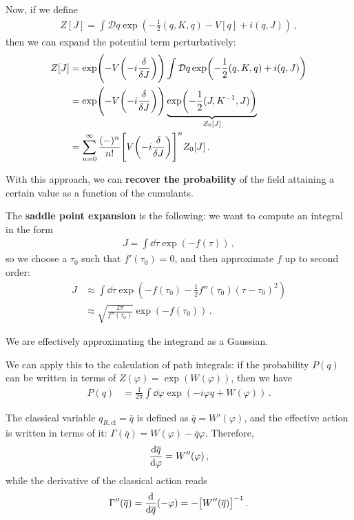 \documentclass[main.tex]{subfiles}
\begin{document}
Now, if we define 
%
\begin{align}
Z[J] = \int \mathcal{D}q \exp(- \frac{1}{2} (q, K, q) - V[q] + i (q, J) )
\,,
\end{align}
%
then we can expand the potential term perturbatively: 
%
\begin{align}
Z[J] &= \exp(- V \qty(-i \fdv{}{J})) 
\int \mathcal{D}q \exp(- \frac{1}{2} (q, K, q) + i (q, J) )  \\
&= \exp(- V \qty(-i \fdv{}{J}))
\underbrace{\exp(- \frac{1}{2} (J, K^{-1}, J))}_{Z_0 [J]}  \\
&= \sum _{n=0}^{\infty } \frac{(-)^{n}}{n!} \qty[V \qty(-i \fdv{}{J})]^{n} Z_0 [J]
\,.
\end{align}

With this approach, we can \textbf{recover the probability} of the field attaining a certain value as a function of the cumulants.

The \textbf{saddle point expansion} is the following: we want to compute an integral in the form 
%
\begin{align}
J = \int \dd{\tau } \exp(
    - f(\tau )
)
\,,
\end{align}
%
so we choose a \(\tau_0 \) such that \(f' (\tau_0 ) = 0\), and then approximate \(f\) up to second order: 
%
\begin{align}
J &\approx \int \dd{\tau } \exp(
    - f(\tau_0 ) - \frac{1}{2} f''(\tau_0 ) (\tau - \tau_0  )^2
)  \\
&\approx \sqrt{\frac{2 \pi }{f''(\tau_0 )}} \exp(- f(\tau_0 ))
\,.
\end{align}

We are effectively approximating the integrand as a Gaussian. 

We can apply this to the calculation of path integrals: if the probability \(P(q)\) can be written in terms of \(Z(\varphi ) = \exp(W(\varphi ))\), then we have 
%
\begin{align}
P(q) &= \frac{1}{2 \pi } \int \dd{\varphi } \exp(-i \varphi q + W(\varphi ))
\,.
\end{align}

The classical variable \(q _{R, \text{cl}} = \overline{q}\) is defined as \(\overline{q}= W' (\varphi ) \), and the effective action is written in terms of it: \(\Gamma (\overline{q}) = W(\varphi ) - \overline{q} \varphi \). Therefore, 
%
\begin{align}
\dv{\overline{q}}{\varphi } = W''(\varphi )
\,,
\end{align}
%
while the derivative of the classical action reads 
%
\begin{align}
\Gamma '' (\overline{q})
= \dv{}{\overline{q}}
\qty(- \varphi ) 
= - \qty[W''(\overline{q})]^{-1}
\,.
\end{align}
\end{document}
